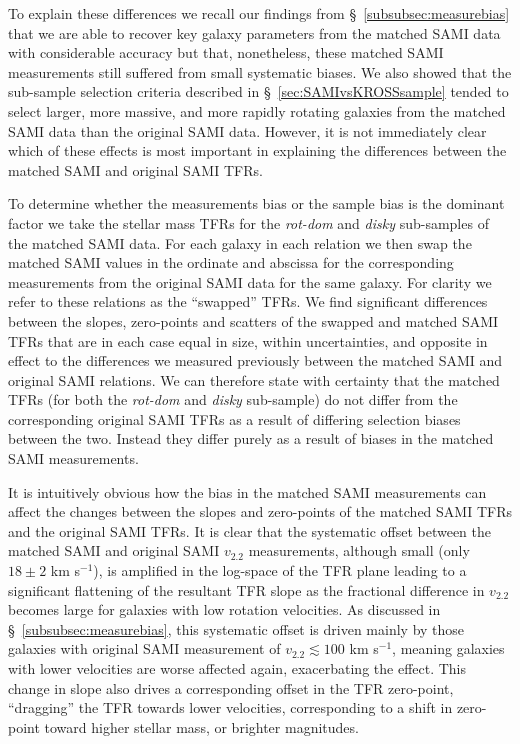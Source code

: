 \documentclass[a4paper,fleqn,usenatbib]{mnras}
\begin{document}
{To explain these differences we recall our findings from \S~\ref{subsubsec:measurebias} that we are able to recover key galaxy parameters from the matched SAMI data with considerable accuracy but that, nonetheless, these matched SAMI measurements still suffered from small systematic biases. We also showed that the sub-sample selection criteria described in \S~\ref{sec:SAMIvsKROSSsample} tended to select larger, more massive, and more rapidly rotating galaxies from the matched SAMI data than the original SAMI data. However, it is not immediately clear which of these effects is most important in explaining the differences between the matched SAMI and original SAMI TFRs. 

To determine whether the measurements bias or the sample bias is the dominant factor we take the stellar mass TFRs for the \textit{rot-dom} and \textit{disky} sub-samples of the matched SAMI data. For each galaxy in each relation we then swap the matched SAMI values in the ordinate and abscissa for the corresponding measurements from the original SAMI data for the same galaxy. For clarity we refer to these relations as the ``swapped'' TFRs. We find significant differences between the slopes, zero-points and scatters of the swapped and matched SAMI TFRs that are in each case equal in size, within uncertainties, and opposite in effect to the differences we measured previously between the matched SAMI and original SAMI relations. We can therefore state with certainty that the matched TFRs (for both the \textit{rot-dom} and \textit{disky} sub-sample) do not differ from the corresponding original SAMI TFRs as a result of differing selection biases between the two. Instead they differ purely as a result of biases in the matched SAMI measurements.

It is intuitively obvious how the bias in the matched SAMI measurements can affect the changes between the slopes and zero-points of the matched SAMI TFRs and the original SAMI TFRs. It is clear that the systematic offset between the matched SAMI and original SAMI $v_{2.2}$ measurements, although small (only $18 \pm 2$ km s$^{-1}$), is amplified in the log-space of the TFR plane leading to a significant flattening of the resultant TFR slope as the fractional difference in $v_{2.2}$ becomes large for galaxies with low rotation velocities. As discussed in \S~\ref{subsubsec:measurebias}, this systematic offset is driven mainly by those galaxies with original SAMI measurement of $v_{2.2} \lesssim 100$ km s$^{-1}$, meaning galaxies with lower velocities are worse affected again,  exacerbating the effect. This change in slope also drives a corresponding offset in the TFR zero-point, ``dragging'' the TFR towards lower velocities, corresponding to a shift in zero-point toward higher stellar mass, or brighter magnitudes.

}
\end{document}
